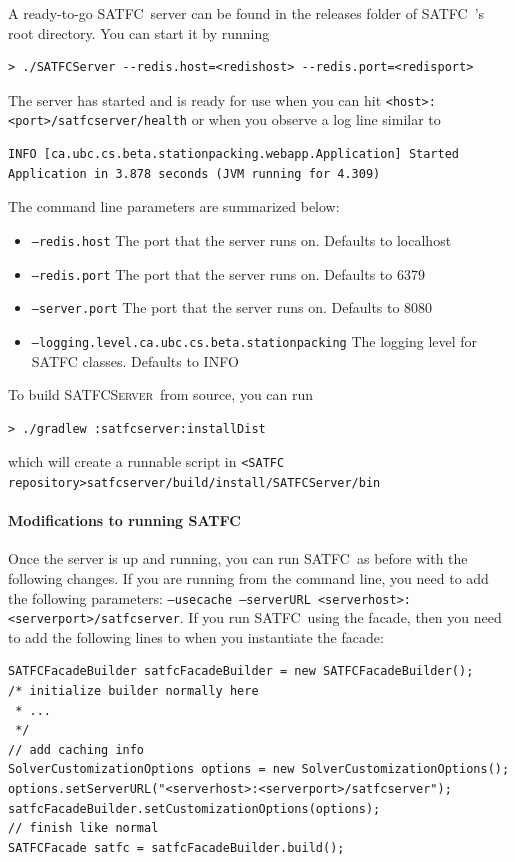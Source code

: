 \documentclass[
10pt, %
letterpaper, %
oneside, %
headinclude,footinclude, %
BCOR5mm, %
needspace, %
]{scrartcl}
\newcommand{\SATFC}{\textsc{SATFC}~}
\newcommand{\SATFCServer}{\textsc{SATFCServer}~}
\begin{document}
A ready-to-go \SATFC server can be found in the releases folder of \SATFC's root directory. You can start it by running
\begin{lstlisting}[style=Bash]
> ./SATFCServer --redis.host=<redishost> --redis.port=<redisport>
\end{lstlisting}
The server has started and is ready for use when you can hit \texttt{<host>:<port>/satfcserver/health} or when you observe a log line similar to 
\begin{lstlisting}[style=Bash]
INFO [ca.ubc.cs.beta.stationpacking.webapp.Application] Started Application in 3.878 seconds (JVM running for 4.309)
\end{lstlisting}
The command line parameters are summarized below:
\begin{itemize}
\item \texttt{---redis.host} The port that the server runs on. Defaults to localhost
\item \texttt{---redis.port} The port that the server runs on. Defaults to 6379
\item \texttt{---server.port} The port that the server runs on. Defaults to 8080
\item \texttt{---logging.level.ca.ubc.cs.beta.stationpacking} The logging level for SATFC classes. Defaults to INFO
\end{itemize}
To build \SATFCServer from source, you can run 
\begin{lstlisting}[style=Bash]
> ./gradlew :satfcserver:installDist
\end{lstlisting}
which will create a runnable script in \texttt{<SATFC repository>satfcserver/build/install/SATFCServer/bin}

\paragraph{Modifications to running \SATFC}
Once the server is up and running, you can run \SATFC as before with the following changes. If you are running from the command line, you need to add the following parameters: \texttt{---usecache ---serverURL <serverhost>:<serverport>/satfcserver}. If you run \SATFC using the facade, then you need to add the following lines to when you instantiate the facade:

\begin{verbatim}
SATFCFacadeBuilder satfcFacadeBuilder = new SATFCFacadeBuilder();
/* initialize builder normally here
 * ...
 */
// add caching info
SolverCustomizationOptions options = new SolverCustomizationOptions();
options.setServerURL("<serverhost>:<serverport>/satfcserver");
satfcFacadeBuilder.setCustomizationOptions(options);
// finish like normal
SATFCFacade satfc = satfcFacadeBuilder.build();
\end{verbatim}
\end{document}

